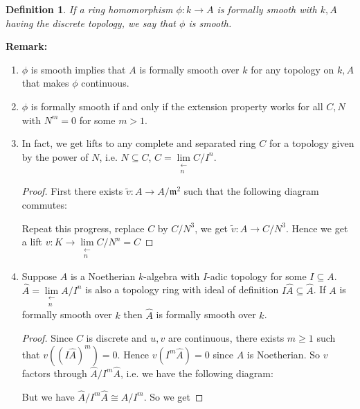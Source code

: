 \documentclass[cs4size]{article}
\newcommand{\su}{\subseteq}
\newcommand{\frm}{\mathfrak{m}}
\newcommand{\ra}{\rightarrow}
\newtheorem{definition}{Definition}
\begin{document}
\begin{definition}
If a ring homomorphism $\phi: k\ra A$ is formally smooth with $k,A$ having the discrete topology, we say that $\phi$ is smooth.
\end{definition}
\textbf{Remark: }
\begin{enumerate}
\item $\phi$ is smooth implies that $A$ is formally smooth over $k$ for any topology on $k,A$ that makes $\phi$ continuous.
\item $\phi$ is formally smooth if and only if the extension property works for all $C,N$ with $N^m=0$ for some $m>1$.
\item In fact, we get lifts to any complete and separated ring $C$ for a topology given by the power of $N$, i.e. $N\su C$, $C=\lim\limits_{\substack{\longleftarrow\\ n}}C/I^n$.
    \begin{proof}
    First there exists $\tilde{v}: A\ra A/\frm^2$ such that the following diagram commutes:

    \begin{center}
\end{center}
Repeat this progress, replace $C$ by $C/N^3$, we get $\tilde{v}: A\ra C/N^3$. Hence we get a lift $v: K\ra \lim\limits_{\substack{\longleftarrow\\ n}}C/N^n=C$
    \end{proof}
\item Suppose $A$ is a Noetherian $k$-algebra with $I$-adic topology for some $I\su A$. $\hat{A}=\lim\limits_{\substack{\longleftarrow\\ n}}A/I^n$ is also a topology ring with ideal of definition $I\hat{A}\su\hat{A}$. If $A$ is formally smooth over $k$ then $\hat{A}$ is formally smooth over $k$.
    \begin{proof}
    Since $C$ is discrete and $u,v$ are continuous, there exists $m\geq 1$ such that $v((I\hat{A})^m)=0$. Hence $v(I^m\hat{A})=0$ since $A$ is Noetherian. So $v$ factors through $\hat{A}/I^m\hat{A}$, i.e. we have the following diagram:

    \begin{center}
    \end{center}
    But we have $\hat{A}/I^m\hat{A}\cong A/I^m$. So we get


\end{proof}
\end{enumerate}
\end{document}
